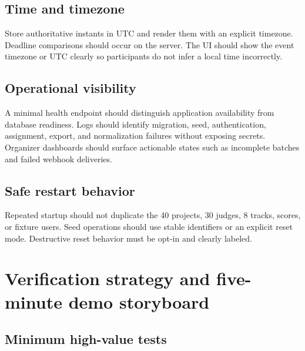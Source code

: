 \subsection{Time and timezone}

Store authoritative instants in UTC and render them with an explicit timezone. Deadline comparisons should occur on the server. The UI should show the event timezone or UTC clearly so participants do not infer a local time incorrectly.

\subsection{Operational visibility}

A minimal health endpoint should distinguish application availability from database readiness. Logs should identify migration, seed, authentication, assignment, export, and normalization failures without exposing secrets. Organizer dashboards should surface actionable states such as incomplete batches and failed webhook deliveries.

\subsection{Safe restart behavior}

Repeated startup should not duplicate the 40 projects, 30 judges, 8 tracks, scores, or fixture users. Seed operations should use stable identifiers or an explicit reset mode. Destructive reset behavior must be opt-in and clearly labeled.

\section{Verification strategy and five-minute demo storyboard}

\advisory\par


\subsection{Minimum high-value tests}


